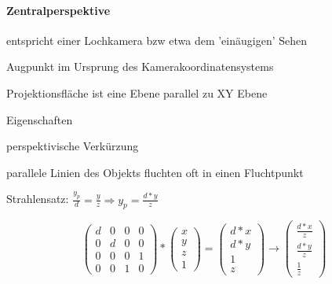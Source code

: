 \documentclass[landscape]{article}
\begin{document}
\begin{multicols}{3}
  \paragraph{Zentralperspektive}
  \begin{itemize*}
    \item entspricht einer Lochkamera bzw etwa dem 'einäugigen' Sehen
    \item Augpunkt im Ursprung des Kamerakoordinatensystems
    \item Projektionsfläche ist eine Ebene parallel zu XY Ebene
    \item Eigenschaften
    \begin{itemize*}
      \item perspektivische Verkürzung
      \item parallele Linien des Objekts fluchten oft in einen Fluchtpunkt
    \end{itemize*}
    \item Strahlensatz: $\frac{y_p}{d}=\frac{y}{z}\Rightarrow y_p=\frac{d*y}{z}$
  \end{itemize*}
  $$\begin{pmatrix} d&0&0&0\\ 0&d&0&0 \\ 0&0&0&1 \\ 0&0&1&0 \end{pmatrix} * \begin{pmatrix}x\\y\\z\\1\end{pmatrix} = \begin{pmatrix} d*x\\ d*y\\ 1 \\ z \end{pmatrix} \rightarrow \begin{pmatrix} \frac{d*x}{z} \\ \frac{d*y}{z} \\ \frac{1}{z} \end{pmatrix}$$
  

\end{multicols}
\end{document}
